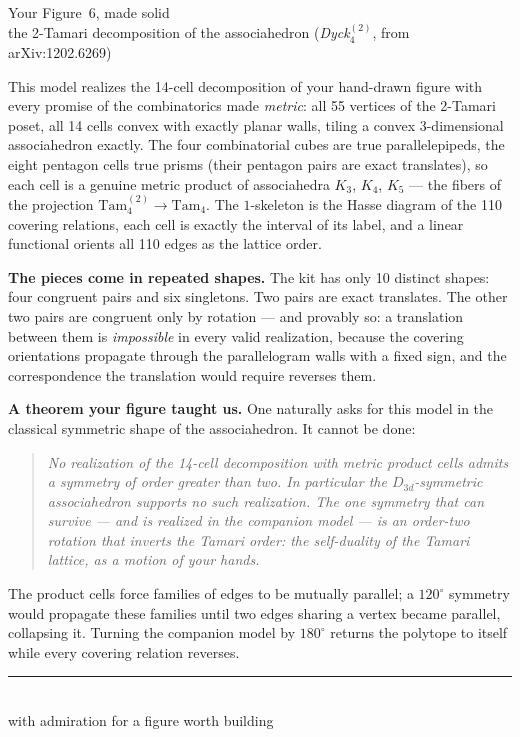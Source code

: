 \documentclass[11pt]{article}
\begin{document}
\begin{center}
{\Large Your Figure~6, made solid}\\[2pt]
{\small the 2-Tamari decomposition of the associahedron
(\emph{Dyck}$^{(2)}_4$, from arXiv:1202.6269)}
\end{center}

\medskip

This model realizes the 14-cell decomposition of your hand-drawn figure with
every promise of the combinatorics made \emph{metric}: all 55 vertices of the
2-Tamari poset, all 14 cells convex with exactly planar walls, tiling a convex
3-dimensional associahedron exactly. The four combinatorial cubes are true
parallelepipeds, the eight pentagon cells true prisms (their pentagon pairs are
exact translates), so each cell is a genuine metric product of associahedra
$K_3$, $K_4$, $K_5$ --- the fibers of the projection
$\mathrm{Tam}^{(2)}_4 \to \mathrm{Tam}_4$. The $1$-skeleton is the Hasse
diagram of the 110 covering relations, each cell is exactly the interval of
its label, and a linear functional orients all 110 edges as the lattice order.

\textbf{The pieces come in repeated shapes.} The kit has only 10 distinct
shapes: four congruent pairs and six singletons. Two pairs are exact
translates. The other two pairs are congruent only by rotation --- and
provably so: a translation between them is \emph{impossible} in every valid
realization, because the covering orientations propagate through the
parallelogram walls with a fixed sign, and the correspondence the translation
would require reverses them.

\textbf{A theorem your figure taught us.} One naturally asks for this model in
the classical symmetric shape of the associahedron. It cannot be done:

\begin{quote}
\emph{No realization of the 14-cell decomposition with metric product cells
admits a symmetry of order greater than two. In particular the
$D_{3d}$-symmetric associahedron supports no such realization. The one
symmetry that can survive --- and is realized in the companion model --- is an
order-two rotation that inverts the Tamari order: the self-duality of the
Tamari lattice, as a motion of your hands.}
\end{quote}

The product cells force families of edges to be mutually parallel; a
$120^\circ$ symmetry would propagate these families until two edges sharing a
vertex became parallel, collapsing it. Turning the companion model by
$180^\circ$ returns the polytope to itself while every covering relation
reverses.

\begin{center}
\rule{0.42\textwidth}{0.4pt}\\[4pt]
{\small with admiration for a figure worth building}
\end{center}
\end{document}
